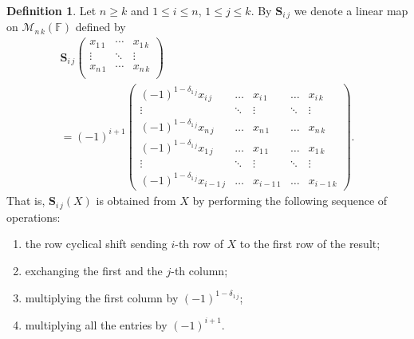 \documentclass{elsarticle}
\def\F{{\mathbb F}}
\def\M{{\mathcal M}}
\def\SCS{{\mathbf S}}
\theoremstyle{plain}
\theoremstyle{definition}
\newtheorem{definition}[theorem]{Definition}
\numberwithin{equation}{section}
\begin{document}
\begin{definition}\label{def:SCSDef}Let $n \ge k$ and $1 \le i \le n$, $1 \le j \le k$. By $\SCS_{i\,j}$ we denote a linear map on $\M_{n\,k}(\F)$ defined by 
\begin{multline*}
\SCS_{i\,j}\begin{pmatrix}
x_{1\,1} & \cdots  & x_{1\,k}\\
  \vdots & \ddots & \vdots\\
x_{n\,1} & \cdots & x_{n\,k}\\
\end{pmatrix}\\ = (-1)^{i+1}\begin{pmatrix}
(-1)^{1 - \delta_{1\,j}}x_{i\, j} & \ldots & x_{i\,1} & \ldots & x_{i\, k}\\
\vdots & \ddots & \vdots & \ddots  & \vdots\\
(-1)^{1 - \delta_{1\,j}}x_{n\, j} & \ldots & x_{n\,1} & \ldots & x_{n\, k}\\
(-1)^{1 - \delta_{1\,j}}x_{1\, j} & \ldots &  x_{1\,1} & \ldots & x_{1\, k}\\
\vdots & \ddots & \vdots & \ddots & \vdots\\
(-1)^{1 - \delta_{1\,j}}x_{i-1\, j} & \ldots & x_{i-1\,1} & \ldots &  x_{i-1\, k}
\end{pmatrix}.
\end{multline*}
That is, $\SCS_{i\,j}(X)$ is obtained from $X$ by performing the following sequence of operations:
\begin{enumerate}
\item\label{lst:SIJSeq:it1}the row cyclical shift sending $i$-th row of $X$ to the first row of the result;
\item exchanging the first and the $j$-th column;
\item\label{lst:SIJSeq:it3} multiplying the first column  by $(-1)^{1 - \delta_{1\,j}}$;
\item multiplying all the entries by $(-1)^{i+1}$.
\end{enumerate}
\end{definition}
\end{document}

